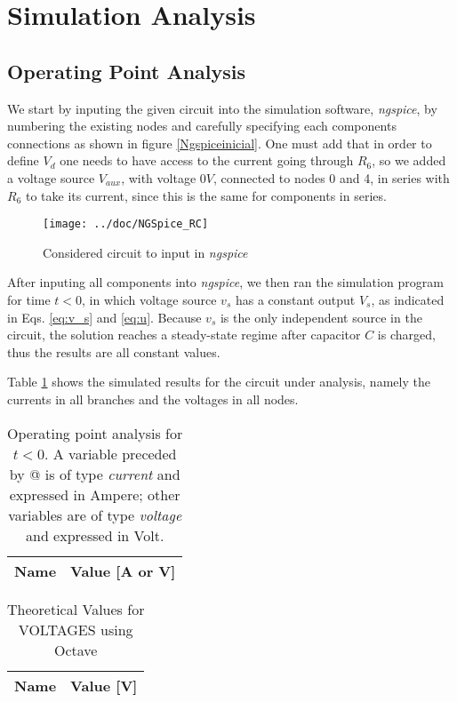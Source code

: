 \section{Simulation Analysis}
\label{sec:simulation}

\subsection{Operating Point Analysis}

We start by inputing the given circuit into the simulation software, \emph{ngspice}, by numbering the existing nodes and carefully specifying each components connections as shown in figure \ref{Ngspiceinicial}.
One must add that in order to define $V_d$ one needs to have access to the current going through $R_6$, so we added a voltage source $V_{aux}$, with voltage $0V$, connected to nodes 0 and 4, in series with $R_6$ to take its current, since this is the same for components in series.

\begin{figure}[H]
  \centering
  \texttt{[image: ../doc/NGSpice\_RC]}
  \caption{Considered circuit to input in \emph{ngspice}}
  \label{fig:fignodos}
\end{figure}

After inputing all components into \emph{ngspice}, we then ran the simulation program for time $t<0$, in which voltage source $v_s$ has a constant output $V_s$, as indicated in Eqs. \ref{eq:v_s} and \ref{eq:u}. Because $v_s$ is the only independent source in the circuit, the solution reaches a steady-state regime after capacitor $C$ is charged, thus the results are all constant values.


Table \ref{tab:ngspice_1} shows the simulated results for the circuit
under analysis, namely the currents in all branches and the voltages in all nodes.
\begin{multicols}{2}

\begin{table}[H]
  \centering
  \begin{tabular}{|l|r|}
    \hline
    {\bf Name} & {\bf Value [A or V]} \\ \hline
    
  \end{tabular}
  \caption{Operating point analysis for $t<0$. A variable preceded by @ is of type {\em current}
    and expressed in Ampere; other variables are of type {\it voltage} and expressed in
    Volt.}
  \label{tab:ngspice_1}
\end{table}

\begin{table}[H]
  \centering
  \begin{tabular}{|l|r|}
    \hline
    {\bf Name} & {\bf Value [V]} \\ \hline
    
  \end{tabular}
  \caption{Theoretical Values for VOLTAGES using Octave}
  \label{tab:alinea1_voltagens_tab_2}
\end{table}

\end{multicols}

